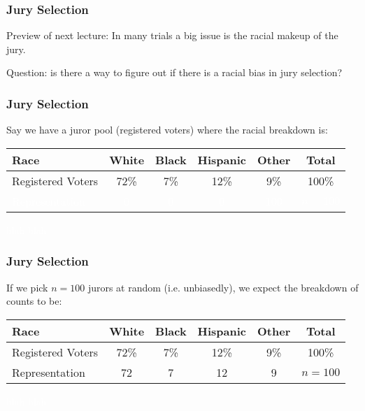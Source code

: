 \documentclass[handout]{beamer}
\newcommand{\blue}[1]{\textcolor{blue2}{#1}}
\newcommand{\white}[1]{\textcolor{white}{#1}}
\begin{document}
\begin{frame}[fragile]
\frametitle{Jury Selection}

Preview of next lecture:  In many trials a big issue is the \blue{racial makeup} of the jury.  

\vspace{0.25cm}

\pause Question: is there a way to figure out if there is a \blue{racial bias} in jury selection?  

\end{frame}


\begin{frame}[fragile]
\frametitle{Jury Selection}
Say we have a juror pool (registered voters) where the racial breakdown is:


\begin{center}
\begin{tabular}{l||cccc|c}
Race & White & Black & Hispanic & Other & Total \\ 
\hline
Registered Voters & 72\% & 7\% & 12\% & 9\% & 100\%\\ 
\textcolor{white}{Representation} & \textcolor{white}{0} & \textcolor{white}{0} & \textcolor{white}{0} & \textcolor{white}{100} & \textcolor{white}{$n=100$} \\ 
\end{tabular}
\end{center}

\white{blah blah}


\end{frame}


\begin{frame}[fragile]
\frametitle{Jury Selection}
If we pick $n=100$ jurors \blue{at random} (i.e. unbiasedly), we \blue{expect} the breakdown of counts to be:

\begin{center}
\begin{tabular}{l||cccc|c}
Race & White & Black & Hispanic & Other & Total \\ 
\hline
Registered Voters & 72\% & 7\% & 12\% & 9\% & 100\%\\ 
Representation & 72 & 7 & 12 & 9 & $n=100$ \\ 
\end{tabular}
\end{center}

\white{blah blah}

\end{frame}
\end{document}
